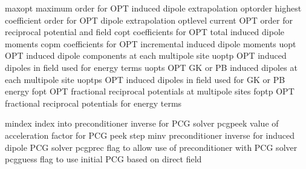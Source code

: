 \documentclass[letterpaper,11pt,english]{sphinxmanual}
\begin{document}
\sphinxAtStartPar
{}

\begin{sphinxVerbatim}[commandchars=\\\{\}]
maxopt          maximum order for OPT induced dipole extrapolation
optorder        highest coefficient order for OPT dipole extrapolation
optlevel        current OPT order for reciprocal potential and field
copt            coefficients for OPT total induced dipole moments
copm            coefficients for OPT incremental induced dipole moments
uopt            OPT induced dipole components at each multipole site
uoptp           OPT induced dipoles in field used for energy terms
uopts           OPT GK or PB induced dipoles at each multipole site
uoptps          OPT induced dipoles in field used for GK or PB energy
fopt            OPT fractional reciprocal potentials at multipole sites
foptp           OPT fractional reciprocal potentials for energy terms
\end{sphinxVerbatim}

\sphinxAtStartPar
{}

\begin{sphinxVerbatim}[commandchars=\\\{\}]
mindex          index into preconditioner inverse for PCG solver
pcgpeek         value of acceleration factor for PCG peek step
minv            preconditioner inverse for induced dipole PCG solver
pcgprec         flag to allow use of preconditioner with PCG solver
pcgguess        flag to use initial PCG based on direct field
\end{sphinxVerbatim}

\sphinxAtStartPar
{}
\end{document}
